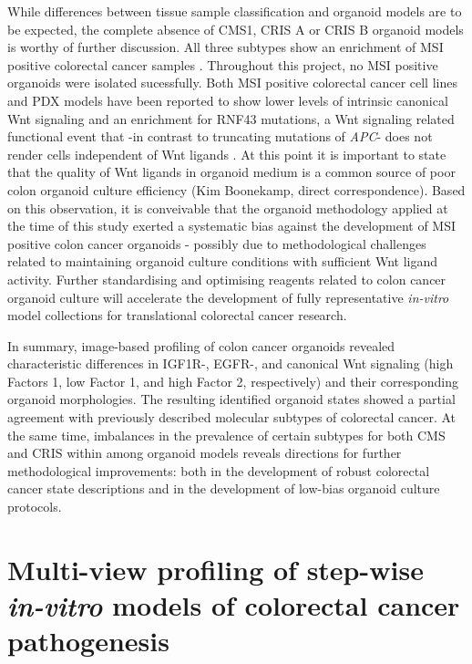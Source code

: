 \begin{flushleft}
While differences between tissue sample classification and organoid models are to be expected, the complete absence of CMS1, CRIS A or CRIS B organoid models is worthy of further discussion. All three subtypes show an enrichment of MSI positive colorectal cancer samples \parencite{guinneyConsensusMolecularSubtypes2015, isellaSelectiveAnalysisCancercell2017a}. Throughout this project, no MSI positive organoids were isolated sucessfully. Both MSI positive colorectal cancer cell lines \parencite{imkellerMetabolicBalanceColorectal2022} and PDX models \parencite{isellaSelectiveAnalysisCancercell2017a} have been reported to show lower levels of intrinsic canonical Wnt signaling and an enrichment for RNF43 mutations, a Wnt signaling related functional event that -in contrast to truncating mutations of \textit{APC}- does not render cells independent of Wnt ligands \parencite{vandeweteringProspectiveDerivationLiving2015}. At this point it is important to state that the quality of Wnt ligands in organoid medium is a common source of poor colon organoid culture efficiency (Kim Boonekamp, direct correspondence). Based on this observation, it is conveivable that the organoid methodology applied at the time of this study exerted a systematic bias against the development of MSI positive colon cancer organoids - possibly due to methodological challenges related to maintaining organoid culture conditions with sufficient Wnt ligand activity. Further standardising and optimising reagents related to colon cancer organoid culture will accelerate the development of fully representative \textit{in-vitro} model collections for translational colorectal cancer research. 
\smallbreak

In summary, image-based profiling of colon cancer organoids revealed characteristic differences in IGF1R-, EGFR-, and canonical Wnt signaling (high Factors 1, low Factor 1, and high Factor 2, respectively) and their corresponding organoid morphologies. The resulting identified organoid states showed a partial agreement with previously described molecular subtypes of colorectal cancer. At the same time, imbalances in the prevalence of certain subtypes for both CMS and CRIS within among organoid models reveals directions for further methodological improvements: both in the development of robust colorectal cancer state descriptions and in the development of low-bias organoid culture protocols. 

\clearpage
\section{Multi-view profiling of step-wise \textit{in-vitro} models of colorectal cancer pathogenesis}


\end{flushleft}
